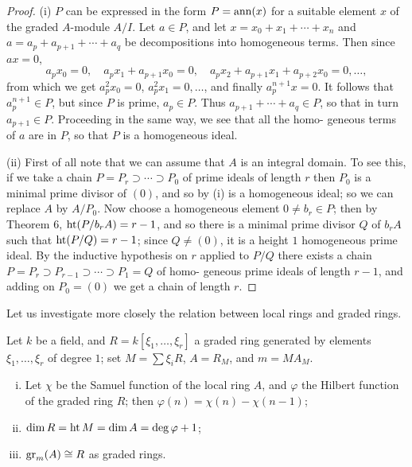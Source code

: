 \begin{proof}
(i) $P$ can be expressed in the form $P = \operatorname{ann}(x)$ for a suitable element
$x$ of the graded $A$-module $A/I$. Let $a \in P$, and let $x = x_0 + x_1 + \cdots + x_n$
and $a = a_p + a_{p+1} + \cdots + a_q$ be decompositions into homogeneous terms.
Then since $ax = 0$,
\[
  a_px_0 = 0, \quad a_px_1 + a_{p+1}x_0 = 0, \quad a_px_2 + a_{p+1}x_1 + a_{p+2}x_0 = 0, \ldots,
\]
from which we get $a_p^2x_0 = 0$, $a_p^2x_1 = 0, \ldots$, and finally $a_p^{n+1}x = 0$. It follows
that $a_p^{n+1} \in P$, but since $P$ is prime, $a_p \in P$. Thus $a_{p+1} + \cdots + a_q \in P$, so
that in turn $a_{p+1} \in P$. Proceeding in the same way, we see that all the homo-
geneous terms of $a$ are in $P$, so that $P$ is a homogeneous ideal.

(ii) First of all note that we can assume that $A$ is an integral domain.
To see this, if we take a chain $P = P_r \supset \cdots \supset P_0$ of prime ideals of length
$r$ then $P_0$ is a minimal prime divisor of $(0)$, and so by (i) is a homogeneous
ideal; so we can replace $A$ by $A/P_0$. Now choose a homogeneous element
$0 \neq b_r \in P$; then by Theorem 6, $\operatorname{ht} (P/b_rA) = r - 1$, and so there is a minimal
prime divisor $Q$ of $b_rA$ such that $\operatorname{ht} (P/Q) = r - 1$; since $Q \neq (0)$, it is a
height $1$ homogeneous prime ideal. By the inductive hypothesis on $r$
applied to $P/Q$ there exists a chain $P = P_r \supset P_{r-1} \supset \cdots \supset P_1 = Q$ of homo-
geneous prime ideals of length $r - 1$, and adding on $P_0 = (0)$ we get a chain
of length $r$.
\end{proof}

Let us investigate more closely the relation between local rings and
graded rings.

\begin{theorem}\label{thm:13.8}
Let $k$ be a field, and $R = k[\xi_1, \ldots, \xi_r]$ a graded ring
generated by elements $\xi_1, \ldots, \xi_r$ of degree $1$; set $M = \sum \xi_iR$, $A = R_M$, and
$m = MA_M$.
\begin{enumerate}[(i)]
  \item Let $\chi$ be the Samuel function of the local ring $A$, and $\varphi$ the Hilbert
        function of the graded ring $R$; then $\varphi(n) = \chi(n) - \chi(n - 1)$;
  \item $\dim R = \operatorname{ht} M = \dim A = \deg \varphi + 1$;
  \item $\operatorname{gr}_m(A) \cong R$ as graded rings.
\end{enumerate}
\end{theorem}

